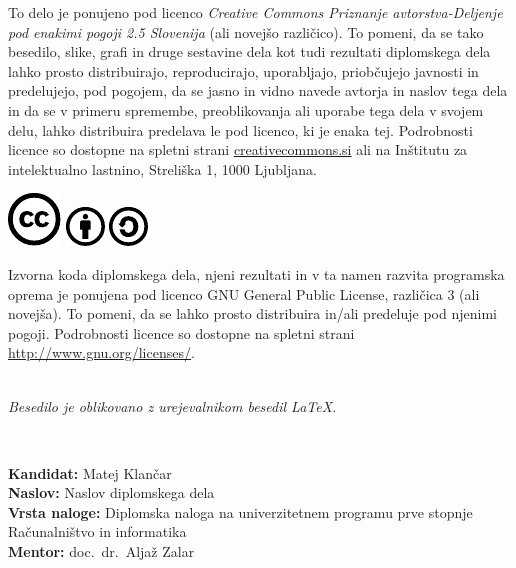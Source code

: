 \documentclass[a4paper,12pt,openright]{book}
\newcommand{\clearemptydoublepage}{\newpage{\pagestyle{empty}\cleardoublepage}}
\newcommand{\CcImageCc}[1]{%
	\includegraphics[scale=#1]{cc_cc_30.pdf}%
}
\newcommand{\CcImageBy}[1]{%
	\includegraphics[scale=#1]{cc_by_30.pdf}%
}
\newcommand{\CcImageSa}[1]{%
	\includegraphics[scale=#1]{cc_sa_30.pdf}%
}
\begin{document}
\newpage
\thispagestyle{empty}

\vspace*{5cm}
{\small \noindent
    To delo je ponujeno pod licenco \textit{Creative Commons Priznanje avtorstva-Deljenje pod enakimi pogoji 2.5 Slovenija} (ali novej\v so razli\v cico).
    To pomeni, da se tako besedilo, slike, grafi in druge sestavine dela kot tudi rezultati diplomskega dela lahko prosto distribuirajo,
    reproducirajo, uporabljajo, priobčujejo javnosti in predelujejo, pod pogojem, da se jasno in vidno navede avtorja in naslov tega
    dela in da se v primeru spremembe, preoblikovanja ali uporabe tega dela v svojem delu, lahko distribuira predelava le pod
    licenco, ki je enaka tej.
    Podrobnosti licence so dostopne na spletni strani \href{http://creativecommons.si}{creativecommons.si} ali na Inštitutu za
    intelektualno lastnino, Streliška 1, 1000 Ljubljana.

    \vspace*{1cm}
    \begin{center}%
        \CcImageCc{0.741573033707865}\hspace*{1ex}\CcImageBy{1}\hspace*{1ex}\CcImageSa{1}%
    \end{center}
}

\vspace*{1cm}
{\small \noindent
    Izvorna koda diplomskega dela, njeni rezultati in v ta namen razvita programska oprema je ponujena pod licenco GNU General Public License,
    različica 3 (ali novejša). To pomeni, da se lahko prosto distribuira in/ali predeluje pod njenimi pogoji.
    Podrobnosti licence so dostopne na spletni strani \url{http://www.gnu.org/licenses/}.
}

\vfill
\begin{center}
    \ \\ \vfill
    {\em
        Besedilo je oblikovano z urejevalnikom besedil \LaTeX.}
\end{center}

\clearemptydoublepage

\thispagestyle{empty}
\
\vfill

\bigskip
\noindent\textbf{Kandidat:} Matej Klančar\\
\noindent\textbf{Naslov:} Naslov diplomskega dela\\
\noindent\textbf{Vrsta naloge:} Diplomska naloga na univerzitetnem programu prve stopnje Računalništvo in informatika \\
\noindent\textbf{Mentor:} doc.\ dr.\ Aljaž Zalar\\
\end{document}
